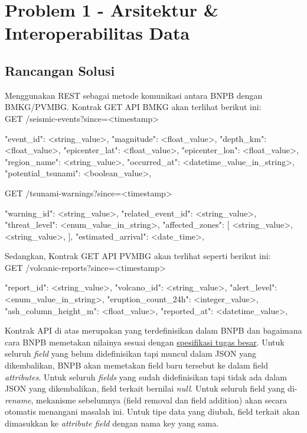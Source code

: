 \chapter{Problem 1 - Arsitektur \& Interoperabilitas Data}

\section{Rancangan Solusi}

Menggunakan REST sebagai metode komunikasi antara BNPB dengan BMKG/PVMBG. Kontrak GET API BMKG akan terlihat berikut ini:\\
GET /seismic-events?since=\textless timestamp\textgreater{}

\begin{codebox}
{
    "event_id": <string_value>,
    "magnitude": <float_value>,
    "depth_km": <float_value>,
    "epicenter_lat": <float_value>,
    "epicenter_lon": <float_value>,
    "region_name": <string_value>,
    "occurred_at": <datetime_value_in_string>,
    "potential_tsunami": <boolean_value>,
}
\end{codebox}

GET /tsunami-warnings?since=\textless timestamp\textgreater{}

\begin{codebox}
{
    "warning_id": <string_value>,
    "related_event_id": <string_value>,
    "threat_level": <enum_value_in_string>,
    "affected_zones":
    [
        <string_value>,
        <string_value>,
    ],
    "estimated_arrival": <date_time>,
}
\end{codebox}

Sedangkan, Kontrak GET API PVMBG akan terlihat seperti berikut ini:\\
GET /volcanic-reports?since=\textless timestamp\textgreater{}

\begin{codebox}
{
    "report_id": <string_value>,
    "volcano_id": <string_value>,
    "alert_level": <enum_value_in_string>,
    "eruption_count_24h": <integer_value>,
    "ash_column_height_m": <float_value>,
    "reported_at": <datetime_value>,
}
\end{codebox}

Kontrak API di atas merupakan yang terdefinisikan dalam BNPB dan bagaimana cara BNPB memetakan nilainya sesuai dengan \href{https://docs.google.com/document/d/1QOSgL0U4eBN-16b3Hkr7ohzDLYPmPC0tlI-CoFZSRm8/edit?tab=t.0\#heading=h.ql4pp1hq9xtx}{spesifikasi tugas besar}. Untuk seluruh \emph{field} yang belum didefinisikan tapi muncul dalam JSON yang dikembalikan, BNPB akan memetakan field baru tersebut ke dalam field \emph{attributes}. Untuk seluruh \emph{fields} yang sudah didefinisikan tapi tidak ada dalam JSON yang dikembalikan, field terkait bernilai \emph{null}. Untuk seluruh field yang di-\emph{rename}, mekanisme sebelumnya (field removal dan field addition) akan secara otomatis menangani masalah ini. Untuk tipe data yang diubah, field terkait akan dimasukkan ke \emph{attribute field} dengan nama key yang sama.

